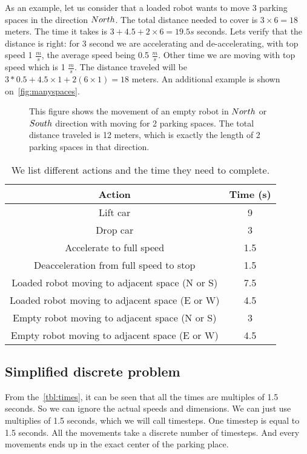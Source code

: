 As an example, let us consider that a loaded robot wants to move 3
parking spaces in the direction $North$. The total distance needed to cover is
$3\times 6 = 18$ meters. The time it takes is $3 + 4.5 + 2 \times 6 = 19.5s$
seconds. Lets verify that the distance is right: for 3 second we are
accelerating and de-accelerating, with top speed 1 $\frac{m}{s}$, the average
speed being 0.5 $\frac{m}{s}$. Other time we are moving with top speed which is 1
$\frac{m}{s}$. The distance traveled will be $3 * 0.5 + 4.5 \times 1 + 2(6
\times 1) = 18$ meters. An additional example is shown
on~\autoref{fig:manyspaces}.
\begin{figure}[h]
    \begin{center}
        
        \caption{This figure shows the movement of an empty robot in $North$ or
            $South$ direction with moving for 2 parking spaces. The total distance
            traveled is 12 meters, which is exactly the length of 2 parking spaces in
        that direction.}
        \label{fig:manyspaces}
    \end{center}
\end{figure}

\begin{table}
    \begin{center}
        \begin{tabular}{| c | c |}
            \hline
            Action & Time (s)\\
            \hline
            Lift car & 9\\
            Drop car & 3\\
            Accelerate to full speed & 1.5\\
            Deacceleration from full speed to stop & 1.5\\
            Loaded robot moving to adjacent space (N or S) & 7.5\\
            Loaded robot moving to adjacent space (E or W) & 4.5\\
            Empty robot moving to adjacent space (N or S) & 3\\
            Empty robot moving to adjacent space (E or W) & 4.5\\
            \hline
        \end{tabular}
        \caption{We list different actions and the time they need to complete.}
        \label{tbl:times}
    \end{center}
\end{table}
\subsection{Simplified discrete problem}
\label{sec:discrete problem}
From the~\autoref{tbl:times}, it can be seen that all the times are multiples
of 1.5 seconds. So we can ignore the actual speeds and dimensions. We can just
use multiplies of 1.5 seconds, which we will call timesteps. One timestep is
equal to 1.5 seconds. All the movements take a discrete number of timesteps.
And every movements ends up in the exact center of the parking place.


